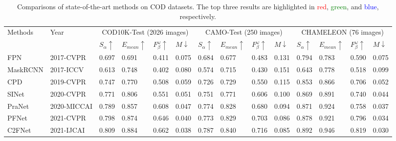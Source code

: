 \documentclass[sigconf,screen]{acmart}
\begin{document}
\begin{table*}[!t]
\centering
\caption{Comparisons of state-of-the-art methods on COD datasets. The top three results are highlighted in 
\textcolor{red}{red}, \textcolor{green}{green}, and \textcolor{blue}{blue}, respectively. 
}
\begin{tabular}{l|l|llll|llll|llll}
\hline
\multirow{2}{*}{Methods} & \multirow{2}{*}{Year} & \multicolumn{4}{c|}{COD10K-Test (2026 images)} & \multicolumn{4}{c|}{CAMO-Test (250 images)} & \multicolumn{4}{c}{CHAMELEON (76 images)} \\ \cline{3-14} 
                         & &   \(S_\alpha\uparrow\)       & \(E_{mean} \uparrow\)      &  \(F_\beta^\omega \uparrow\)       &  \(M\downarrow\)       & \(S_\alpha\uparrow\)      & \(E_{mean}\uparrow\)       & \(F_\beta^\omega \uparrow\)        &  \(M\downarrow\)    &  \(S_\alpha\uparrow\)    &  \(E_{mean} \uparrow\)       &\(F_\beta^\omega \uparrow\)        & \(M\downarrow\)      \\ \hline
FPN      {\cite{r58}}        & 2017-CVPR             & 0.697     & 0.691     & 0.411     & 0.075    & 0.684    & 0.677    & 0.483    & 0.131    & 0.794    & 0.783    & 0.590   & 0.075   \\
MaskRCNN {\cite{r59}}        & 2017-ICCV             & 0.613     & 0.748     & 0.402     & 0.080    & 0.574    & 0.715    & 0.430    & 0.151    & 0.643    & 0.778    & 0.518   & 0.099   \\
CPD      {\cite{r34}}        & 2019-CVPR             & 0.747     & 0.770     & 0.508     & 0.059    & 0.726    & 0.729    & 0.550    & 0.115    & 0.853    & 0.866    & 0.706   & 0.052   \\
SINet     {\cite{r7}}        & 2020-CVPR             & 0.771     & 0.806     & 0.551     & 0.051    & 0.751    & 0.771    & 0.606    & 0.100    & 0.869    & 0.891    & 0.740   & 0.044   \\
PraNet    {\cite{r24}}           & 2020-MICCAI           & 0.789     & 0.857     & 0.608     & 0.047    & 0.774    & 0.828    & 0.680    & 0.094    & 0.871    & 0.924    & 0.758   & 0.037   \\
PFNet     {\cite{r15}}          & 2021-CVPR             & 0.798     & 0.874     & 0.646     & 0.040    & 0.773    & 0.829    & 0.703    & 0.086    & 0.878    & 0.921    & 0.796   & 0.034   \\
C2FNet    {\cite{r52}}            & 2021-IJCAI            & 0.809     & 0.884     & 0.662     & 0.038    & 0.787    & 0.840    & 0.716    & 0.085    & 0.892    & 0.946    & 0.819   & 0.030   \\

\end{tabular}
\end{table*}
\end{document}
